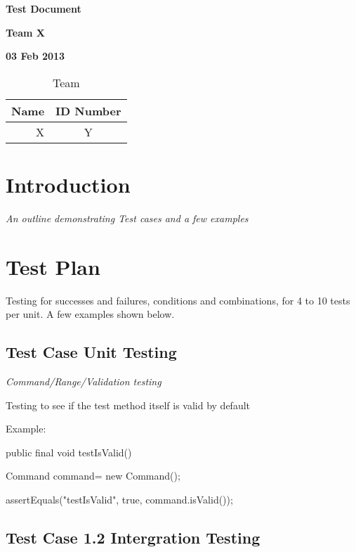 \documentclass[12pt]{article}
\begin{document}
\vspace*{0.5in}
\centerline{\bf\Large Test Document}

\vspace*{0.5in}
\centerline{\bf\Large Team X}

\vspace*{0.5in}
\centerline{\bf\Large 03 Feb 2013}

\vspace*{1.5in}
\begin{table}[htbp]
\caption{Team}
\begin{center}
\begin{tabular}{|r | c|}
\hline
Name & ID Number \\
\hline\hline
X & Y \\
\hline
\end{tabular}
\end{center}
\end{table}

\clearpage

\section{Introduction}

{\it
An outline demonstrating Test cases and a few examples
 
}

\section{Test Plan}
Testing for successes and failures, conditions and combinations, for 4 to 10 tests per unit.  A few examples shown below.
  \subsection{Test Case   Unit Testing}

{\it
 Command/Range/Validation testing





 Testing to see if the test method itself is valid by default
}

 Example:

	public final void testIsValid()

	Command command= new Command();

	assertEquals("testIsValid", true, command.isValid());



  \subsection{Test Case 1.2  Intergration Testing}
\end{document}
